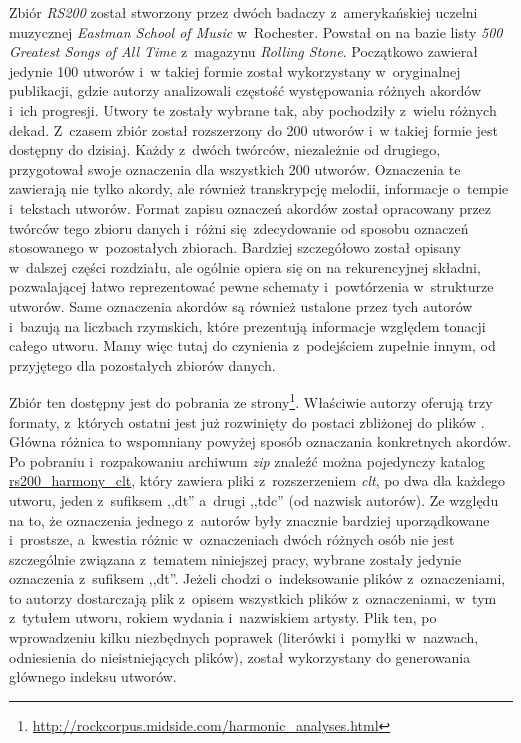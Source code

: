 Zbiór \emph{RS200} \cite{de_clercq_corpus_2011} został stworzony przez dwóch badaczy z~amerykańskiej uczelni muzycznej \emph{Eastman School of Music} w~Rochester. Powstał on na bazie listy \emph{500 Greatest Songs of All Time} z~magazynu \emph{Rolling Stone}. Początkowo zawierał jedynie 100 utworów i~w takiej formie został wykorzystany w~oryginalnej publikacji, gdzie autorzy analizowali częstość występowania różnych akordów i~ich progresji. Utwory te zostały wybrane tak, aby pochodziły z~wielu różnych dekad. Z~czasem zbiór został rozszerzony do 200 utworów i~w takiej formie jest dostępny do dzisiaj. Każdy z~dwóch twórców, niezależnie od drugiego, przygotował swoje oznaczenia dla wszystkich 200 utworów. Oznaczenia te zawierają nie tylko akordy, ale również transkrypcję melodii, informacje o~tempie i~tekstach utworów. Format zapisu oznaczeń akordów został opracowany przez twórców tego zbioru danych i~różni się zdecydowanie od sposobu oznaczeń stosowanego w~pozostałych zbiorach.  Bardziej szczegółowo został opisany w~dalszej części rozdziału, ale ogólnie opiera się on na rekurencyjnej składni, pozwalającej łatwo reprezentować pewne schematy i~powtórzenia w~strukturze utworów. Same oznaczenia akordów są również ustalone przez tych autorów i~bazują na liczbach rzymskich, które prezentują informacje względem tonacji całego utworu. Mamy więc tutaj do czynienia z~podejściem zupełnie innym, od przyjętego dla pozostałych zbiorów danych.

Zbiór ten dostępny jest do pobrania ze strony\footnote{\url{http://rockcorpus.midside.com/harmonic_analyses.html}}. Właściwie autorzy oferują trzy formaty, z~których ostatni jest już rozwinięty do postaci zbliżonej do plików . Główna różnica to wspomniany powyżej sposób oznaczania konkretnych akordów. Po pobraniu i~rozpakowaniu archiwum \emph{zip} znaleźć można pojedynczy katalog \url{rs200_harmony_clt}, który zawiera pliki z~rozszerzeniem \emph{clt}, po dwa dla każdego utworu, jeden z~sufiksem ,,dt'' a~drugi ,,tdc'' (od nazwisk autorów). Ze względu na to, że oznaczenia jednego z~autorów były znacznie bardziej uporządkowane i~prostsze, a~kwestia różnic w~oznaczeniach dwóch różnych osób nie jest szczególnie związana z~tematem niniejszej pracy, wybrane zostały jedynie oznaczenia z~sufiksem ,,dt''. Jeżeli chodzi o~indeksowanie plików z~oznaczeniami, to autorzy dostarczają plik  z~opisem wszystkich plików z~oznaczeniami, w~tym z~tytułem utworu, rokiem wydania i~nazwiskiem artysty. Plik ten, po wprowadzeniu kilku niezbędnych poprawek (literówki i~pomyłki w~nazwach, odniesienia do nieistniejących plików), został wykorzystany do generowania głównego indeksu utworów.

